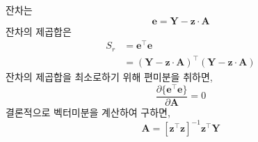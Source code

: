 잔차는
\begin{equation}
\mathbf{e}=\mathbf{Y}-\mathbf{z}\cdot\mathbf{A}
\end{equation}
잔차의 제곱합은
\begin{align}
S_{r}&=\mathbf{e}^{\top}\mathbf{e}\\
&=(\mathbf{Y}-\mathbf{z}\cdot\mathbf{A})^{\top}(\mathbf{Y}-\mathbf{z}\cdot\mathbf{A})\label{eq:reg-29}
\end{align}
잔차의 제곱합을 최소로하기 위해 편미분을 취하면,
\begin{equation}
\frac{\partial \{\mathbf{e}^{\top}\mathbf{e}\}}{\partial\mathbf{A}}=0
\end{equation}
결론적으로 벡터미분을 계산하여 구하면,
\begin{equation}\label{eq:reg-31}
\mathbf{A}=\left[\mathbf{z}^{\top}\mathbf{z}\right]^{-1}\mathbf{z}^{\top}\mathbf{Y}
\end{equation}
